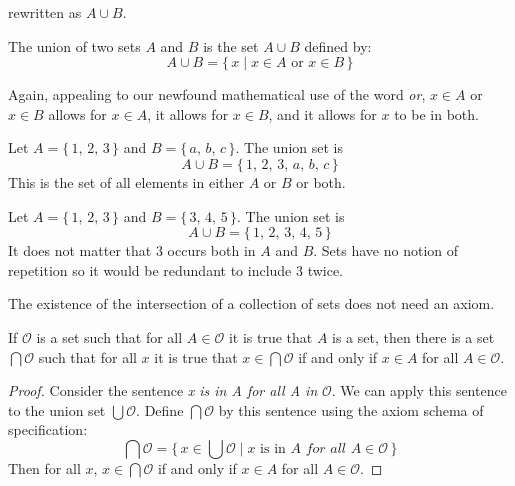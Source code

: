             rewritten as $A\cup{B}$.
            \begin{definition}
                The union of two sets $A$ and $B$ is the set $A\cup{B}$ defined
                by:
                \begin{equation}
                    A\cup{B}=\{\,x\;|\;x\in{A}\textrm{ or }x\in{B}\,\}
                \end{equation}
            \end{definition}
            Again, appealing to our newfound mathematical use of the word
            \textit{or}, $x\in{A}$ or $x\in{B}$ allows for $x\in{A}$, it allows
            for $x\in{B}$, and it allows for $x$ to be in both.
            \begin{example}
                Let $A=\{\,1,\,2,\,3\,\}$ and $B=\{\,a,\,b,\,c\,\}$. The
                union set is
                \begin{equation}
                    A\cup{B}=\{\,1,\,2,\,3,\,a,\,b,\,c\,\}
                \end{equation}
                This is the set of all elements in either $A$ or $B$ or both.
            \end{example}
            \begin{example}
                Let $A=\{\,1,\,2,\,3\,\}$ and $B=\{\,3,\,4,\,5\,\}$. The union
                set is
                \begin{equation}
                    A\cup{B}=\{\,1,\,2,\,3,\,4,\,5\,\}
                \end{equation}
                It does not matter that $3$ occurs both in $A$ and $B$. Sets
                have no notion of repetition so it would be redundant to
                include $3$ twice.
            \end{example}
            The existence of the intersection of a collection of sets does
            not need an axiom.
            \begin{theorem}
                If $\mathcal{O}$ is a set such that for all $A\in\mathcal{O}$
                it is true that $A$ is a set, then there is a set
                $\bigcap\mathcal{O}$ such that for all $x$ it is true that
                $x\in\bigcap\mathcal{O}$ if and only if $x\in{A}$ for all
                $A\in\mathcal{O}$.
            \end{theorem}
            \begin{proof}
                Consider the sentence \textit{x is in A for all A in}
                $\mathcal{O}$. We can apply this sentence to the union set
                $\bigcup\mathcal{O}$. Define $\bigcap\mathcal{O}$ by this
                sentence using the axiom schema of specification:
                \begin{equation}
                    \bigcap\mathcal{O}=\{\,x\in\bigcup\mathcal{O}\;|\;
                        x\textrm{ is in }A
                        \textit{ for all }A\in\mathcal{O}\,\}
                \end{equation}
                Then for all $x$, $x\in\bigcap\mathcal{O}$ if and only if
                $x\in{A}$ for all $A\in\mathcal{O}$.
            \end{proof}

